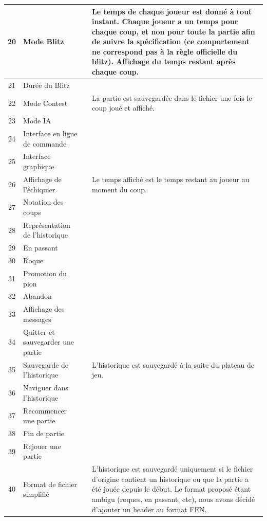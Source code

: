 \documentclass{article}
\newcommand{\valid}{\textcolor{green}{\ding{108}}}  %
\begin{document}
\begin{longtable}{|c|p{5cm}|c|p{5cm}|}
    \hline
    20 & Mode Blitz & \valid & Le temps de chaque joueur est donné à tout instant. Chaque joueur a un temps pour chaque coup, et non pour toute la partie afin de suivre la spécification (ce comportement ne correspond pas à la règle officielle du blitz). Affichage du temps restant après chaque coup.\\
    \hline
    21 & Durée du Blitz & \valid & \\
    \hline
    22 & Mode Contest & \valid & La partie est sauvegardée dans le fichier une fois le coup joué et affiché.\\
    \hline
    23 & Mode IA & \valid & \\
    \hline
    24 & Interface en ligne de commande & \valid & \\
    \hline
    25 & Interface graphique & \valid & \\
    \hline
    26 & Affichage de l'échiquier & \valid & Le temps affiché est le temps restant au joueur au moment du coup.\\
    \hline
    27 & Notation des coups & \valid & \\
    \hline
    28 & Représentation de l'historique & \valid & \\
    \hline
    29 & En passant & \valid & \\
    \hline
    30 & Roque & \valid & \\
    \hline
    31 & Promotion du pion & \valid & \\
    \hline
    32 & Abandon & \valid & \\
    \hline
    33 & Affichage des messages & \valid & \\
    \hline
    34 & Quitter et sauvegarder une partie & \valid & \\
    \hline
    35 & Sauvegarde de l’historique & \valid & L'historique est sauvegardé à la suite du plateau de jeu. \\
    \hline
    36 & Naviguer dans l'historique & \valid & \\
    \hline
    37 & Recommencer une partie & \valid & \\
    \hline
    38 & Fin de partie & \valid & \\
    \hline
    39 & Rejouer une partie & \valid & \\
    \hline
    40 & Format de fichier simplifié & \valid & L'historique est sauvegardé uniquement si le fichier d'origine contient un historique ou que la partie a été jouée depuis le début. Le format proposé étant ambigu (roques, en passant, etc), nous avons décidé d'ajouter un header au format FEN. \\

\end{longtable}
\end{document}

